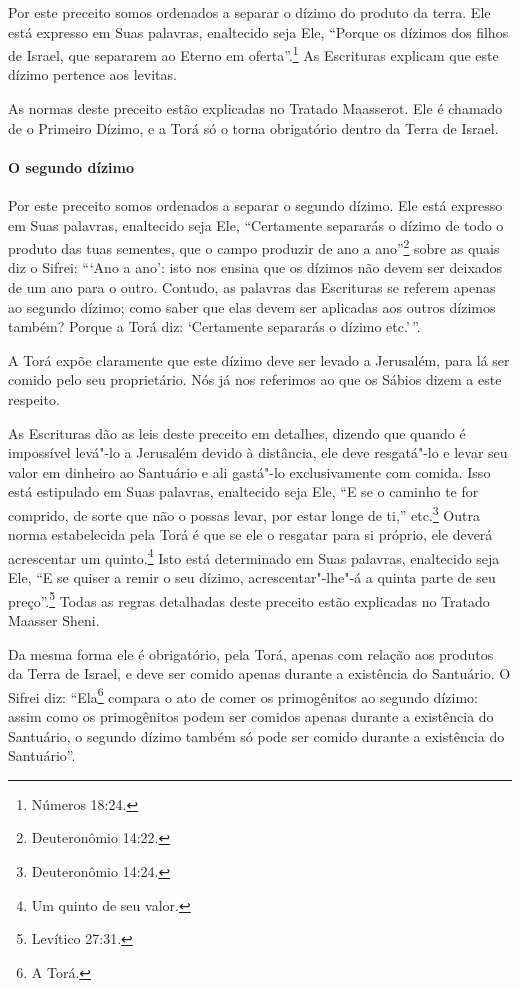 \begin{multicols}{2}
Por este preceito somos ordenados a separar o dízimo do produto da
terra. Ele está expresso em Suas palavras, enaltecido seja Ele, ``Porque
os dízimos dos filhos de Israel, que separarem ao Eterno em oferta''.\footnote{Números 18:24.} As Escrituras explicam que este dízimo pertence aos
levitas\starr.

As normas deste preceito estão explicadas no Tratado Maasserot\starr. Ele é
chamado de o Primeiro Dízimo, e a Torá\starr{} só o torna obrigatório dentro da
Terra de Israel.

\paragraph{O segundo dízimo}

Por este preceito somos ordenados a separar o segundo dízimo. Ele está
expresso em Suas palavras, enaltecido seja Ele, ``Certamente separarás o
dízimo de todo o produto das tuas sementes, que o campo produzir de ano
a ano''\footnote{Deuteronômio 14:22.} sobre as quais diz o Sifrei\starr: ```Ano a ano':
isto nos ensina que os dízimos não devem ser deixados de um ano para o
outro. Contudo, as palavras das Escrituras se referem apenas ao segundo
dízimo; como saber que elas devem ser aplicadas aos outros dízimos
também? Porque a Torá\starr{} diz: `Certamente separarás o dízimo etc.'\,''.

A Torá\starr{} expõe claramente que este dízimo deve ser levado a Jerusalém,
para lá ser comido pelo seu proprietário. Nós já nos referimos ao que os
Sábios dizem a este respeito.

As Escrituras dão as leis deste preceito em detalhes, dizendo que quando
é impossível levá"-lo a Jerusalém devido à distância, ele deve resgatá"-lo
e levar seu valor em dinheiro ao Santuário e ali gastá"-lo
exclusivamente com comida. Isso está estipulado em Suas palavras,
enaltecido seja Ele, ``E se o caminho te for comprido, de sorte que não o possas levar, por estar longe de ti,'' etc.\footnote{Deuteronômio 14:24.} Outra norma estabelecida pela Torá\starr{} é que se ele o resgatar para si próprio, ele deverá acrescentar um
quinto.\footnote{Um quinto de seu valor.} Isto está determinado em Suas palavras,
enaltecido seja Ele, ``E se quiser a remir o seu dízimo, acrescentar"-lhe"-á a quinta parte de seu preço''.\footnote{Levítico 27:31.}
Todas as regras detalhadas deste preceito estão explicadas no Tratado Maasser
Sheni\starr.

Da mesma forma ele é obrigatório, pela Torá\starr, apenas com relação aos
produtos da Terra de Israel, e deve ser comido apenas durante a
existência do Santuário. O Sifrei\starr{} diz: ``Ela\footnote{A Torá\starr.}
compara o ato de comer os primogênitos ao segundo dízimo: assim como os
primogênitos podem ser comidos apenas durante a existência do
Santuário, o segundo dízimo também só pode ser comido durante a
existência do Santuário''.


\end{multicols}
